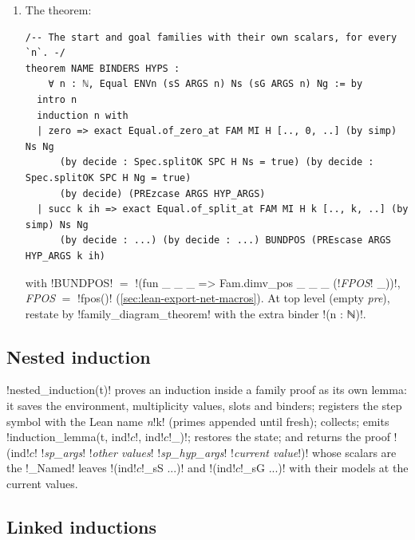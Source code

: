 {\begin{algorithm}
\begin{enumerate}
\begin{lstlisting}[style=grammar]
theorem PREscase BINDERS HYPS (k : ℕ)
    (ih : Equal ENVk (PREsS ARGS k) Ns (PREsG ARGS k) Ng) :
    Equal ENVk (PREsS ARGS (k + 1)) (Net.split SPC H Ns) (PREsG ARGS (k + 1)) (Net.split SPC H Ng) :=
  Equal.rescale CHAIN (by ...; nzt) (by simp only [DEFS]; all_goals (HST))
\end{lstlisting}
\item The theorem:
\begin{lstlisting}[style=grammar]
/-- The start and goal families with their own scalars, for every `n`. -/
theorem NAME BINDERS HYPS :
    ∀ n : ℕ, Equal ENVn (sS ARGS n) Ns (sG ARGS n) Ng := by
  intro n
  induction n with
  | zero => exact Equal.of_zero_at FAM MI H [.., 0, ..] (by simp) Ns Ng
      (by decide : Spec.splitOK SPC H Ns = true) (by decide : Spec.splitOK SPC H Ng = true)
      (by decide) (PREzcase ARGS HYP_ARGS)
  | succ k ih => exact Equal.of_split_at FAM MI H k [.., k, ..] (by simp) Ns Ng
      (by decide : ...) (by decide : ...) BUNDPOS (PREscase ARGS HYP_ARGS k ih)
\end{lstlisting}
  with \code!BUNDPOS! $=$ \code!(fun _ _ _ => Fam.dimv_pos _ _ _ (!\textit{FPOS}\code! _))!, \textit{FPOS}
  $=$ \py!fpos()! (\cref{sec:lean-export-net-macros}).
  At top level (empty \textit{pre}), restate by \py!family_diagram_theorem! with the extra binder
  \code!(n : ℕ)!.
\end{enumerate}
\end{algorithm}

\subsection{Nested induction}\label{sec:lean-export-net-nested}

\py!nested_induction(t)! proves an induction inside a family proof as its own lemma: it saves the
environment, multiplicity values, slots and binders; registers the step symbol with the Lean name
\textit{n}\code!k! (primes appended until fresh); collects; emits \py!induction_lemma(t, ind!$c$\code!, ind!$c$\code!_)!;
restores the state; and returns the proof
\code!(ind!$c$\code! !\textit{sp\_args}\code! !\textit{other values}\code! !\textit{sp\_hyp\_args}\code! !\textit{current value}\code!)!
whose scalars are the \py!_Named! leaves \code!(ind!$c$\code!_sS ...)! and \code!(ind!$c$\code!_sG ...)!
with their models at the current values.

\subsection{Linked inductions}\label{sec:lean-export-net-linked}

}
